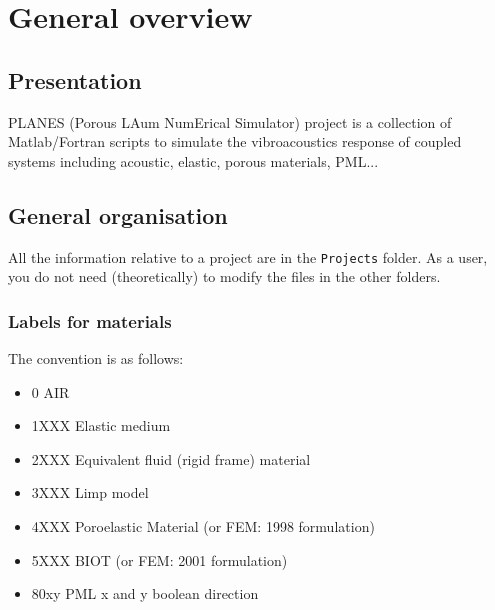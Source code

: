 \documentclass[11pt,A4paper]{book}
\title{\tb{PLANES Users Guide}}
\author{Olivier DAZEL\\
LAUM UMR CNRS 6613\\
olivier.dazel@univ-lemans.fr}
\renewcommand{\:}{\tb{:}}
\begin{document}
\maketitle

\tableofcontents


\chapter{General overview}

\section{Presentation}

PLANES (Porous LAum NumErical Simulator) project is a collection of Matlab/Fortran scripts to simulate the vibroacoustics response of coupled systems including acoustic, elastic, porous materials, PML... 

\section{General organisation}

All the information relative to a project are in the \verb?Projects? folder. As a user, you do not need (theoretically) to modify the files in the other folders. 

\subsection{Labels for materials \label{sec:label_materials}}

The convention is as follows:  
  
  
\begin{itemize}
\item 0 AIR
\item 1XXX Elastic medium
\item 2XXX Equivalent fluid (rigid frame) material
\item 3XXX Limp model
\item 4XXX Poroelastic Material (or FEM: 1998 formulation)
\item 5XXX BIOT (or FEM: 2001 formulation) 
\item 80xy PML x and y boolean direction
\end{itemize}
\end{document}
